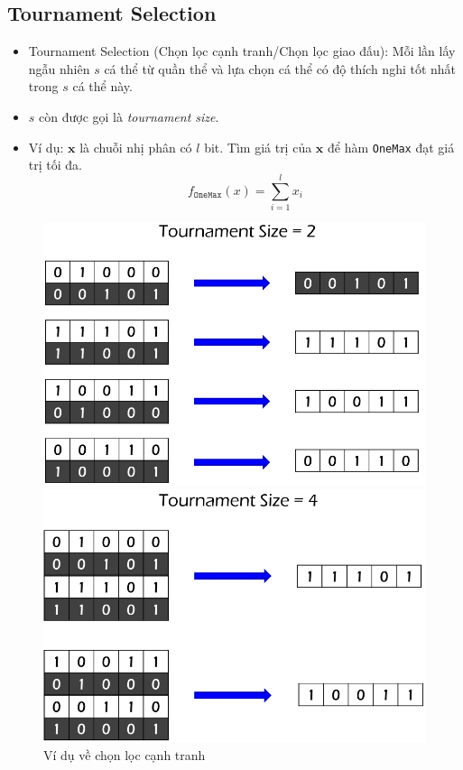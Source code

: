 \documentclass{book}
\begin{document}
\subsection{Tournament Selection}
\begin{itemize}
    \item Tournament Selection (Chọn lọc cạnh tranh/Chọn lọc giao đấu): Mỗi lần lấy ngẫu nhiên $s$ cá thể từ quần thể và lựa chọn cá thể có độ thích nghi tốt nhất trong $s$ cá thể này.
    \item $s$ còn được gọi là \textit{tournament size}.
    \item Ví dụ: $\mathbf{x}$ là chuỗi nhị phân có $l$ bit. Tìm giá trị của $\mathbf{x}$ để hàm \texttt{OneMax} đạt giá trị tối đa. \begin{equation*}
        f_{\texttt{OneMax}}(x)=\sum_{i=1}^{l}{x_i}
    \end{equation*}
\end{itemize}
\begin{figure}[H]
    \centering
    \begin{minipage}[c]{0.45\textwidth}
        \centering
        \includegraphics[width=\linewidth]{images/tournament_selection_ex1.png}
    \end{minipage}\hfill
    \begin{minipage}[c]{0.45\textwidth}
        \centering
        \includegraphics[width=\linewidth]{images/tournament_selection_ex2.png}
    \end{minipage}
    \caption{Ví dụ về chọn lọc cạnh tranh}
    \label{fig:tournament_selection_ex}
\end{figure}
\end{document}
